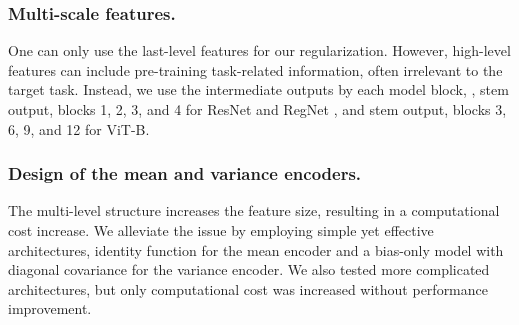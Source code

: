 \subsubsection{Multi-scale features.}
One can only use the last-level features for our regularization.
However, high-level features can include pre-training task-related information, often irrelevant to the target task. 
Instead,
we use the intermediate outputs by each model block, \ie, stem output, blocks 1, 2, 3, and 4 for ResNet \cite{he2016_cvpr_resnet} and RegNet \cite{radosavovic2020regnet}, and stem output, blocks 3, 6, 9, and 12 for ViT-B.


\subsubsection{Design of the mean and variance encoders.} The multi-level structure increases the feature size, resulting in a computational cost increase. 
We alleviate the issue by employing 
simple yet effective architectures, identity function for the mean encoder and a bias-only model with diagonal covariance for the variance encoder.
We also tested more complicated architectures, but only computational cost was increased without performance improvement.
